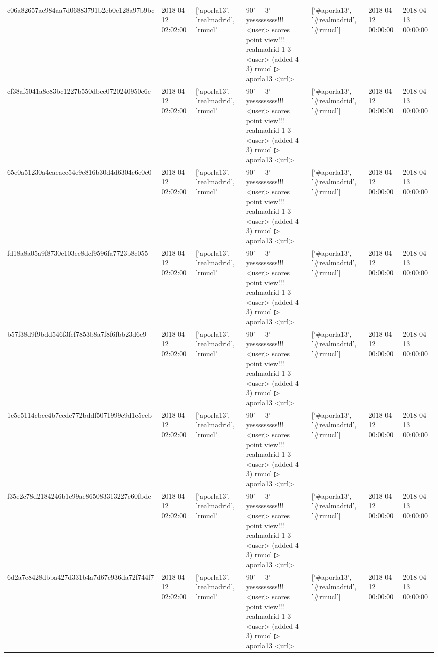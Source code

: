 \begin{tabular}{lllllll}
c06a82657ac984aa7d06883791b2eb0e128a97b9bc & 2018-04-12 02:02:00 & ['aporla13', 'realmadrid', 'rmucl'] & 90' + 3' yesssssssss!!! <user> scores point view!!! realmadrid 1-3 <user> (added 4-3) rmucl ▷ aporla13 <url> & ['#aporla13', '#realmadrid', '#rmucl'] & 2018-04-12 00:00:00 & 2018-04-13 00:00:00 \\
cf38af5041a8e83bc1227b550dbce0720240950c6e & 2018-04-12 02:02:00 & ['aporla13', 'realmadrid', 'rmucl'] & 90' + 3' yesssssssss!!! <user> scores point view!!! realmadrid 1-3 <user> (added 4-3) rmucl ▷ aporla13 <url> & ['#aporla13', '#realmadrid', '#rmucl'] & 2018-04-12 00:00:00 & 2018-04-13 00:00:00 \\
65e0a51230a4eaeace54e9e816b30d4d6304e6e0c0 & 2018-04-12 02:02:00 & ['aporla13', 'realmadrid', 'rmucl'] & 90' + 3' yesssssssss!!! <user> scores point view!!! realmadrid 1-3 <user> (added 4-3) rmucl ▷ aporla13 <url> & ['#aporla13', '#realmadrid', '#rmucl'] & 2018-04-12 00:00:00 & 2018-04-13 00:00:00 \\
fd18a8a05a9f8730e103ee8dcf9596fa7723b8c055 & 2018-04-12 02:02:00 & ['aporla13', 'realmadrid', 'rmucl'] & 90' + 3' yesssssssss!!! <user> scores point view!!! realmadrid 1-3 <user> (added 4-3) rmucl ▷ aporla13 <url> & ['#aporla13', '#realmadrid', '#rmucl'] & 2018-04-12 00:00:00 & 2018-04-13 00:00:00 \\
b57f38d9f9bdd546f3fef7853b8a7f8f6fbb23d6e9 & 2018-04-12 02:02:00 & ['aporla13', 'realmadrid', 'rmucl'] & 90' + 3' yesssssssss!!! <user> scores point view!!! realmadrid 1-3 <user> (added 4-3) rmucl ▷ aporla13 <url> & ['#aporla13', '#realmadrid', '#rmucl'] & 2018-04-12 00:00:00 & 2018-04-13 00:00:00 \\
1c5e5114cbcc4b7ecdc772bddf5071999c9d1e5ecb & 2018-04-12 02:02:00 & ['aporla13', 'realmadrid', 'rmucl'] & 90' + 3' yesssssssss!!! <user> scores point view!!! realmadrid 1-3 <user> (added 4-3) rmucl ▷ aporla13 <url> & ['#aporla13', '#realmadrid', '#rmucl'] & 2018-04-12 00:00:00 & 2018-04-13 00:00:00 \\
f35e2c78d2184246b1c99ae865083313227e60fbdc & 2018-04-12 02:02:00 & ['aporla13', 'realmadrid', 'rmucl'] & 90' + 3' yesssssssss!!! <user> scores point view!!! realmadrid 1-3 <user> (added 4-3) rmucl ▷ aporla13 <url> & ['#aporla13', '#realmadrid', '#rmucl'] & 2018-04-12 00:00:00 & 2018-04-13 00:00:00 \\
6d2a7e8428dbba427d331b4a7d67c936da72f744f7 & 2018-04-12 02:02:00 & ['aporla13', 'realmadrid', 'rmucl'] & 90' + 3' yesssssssss!!! <user> scores point view!!! realmadrid 1-3 <user> (added 4-3) rmucl ▷ aporla13 <url> & ['#aporla13', '#realmadrid', '#rmucl'] & 2018-04-12 00:00:00 & 2018-04-13 00:00:00 \\

\end{tabular}
